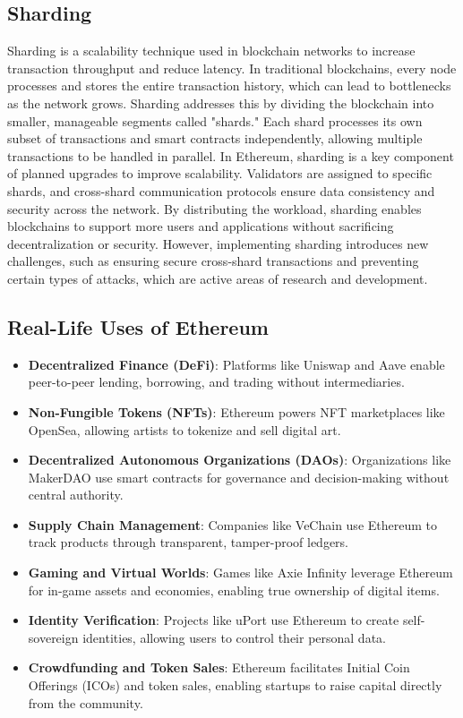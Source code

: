 \documentclass[12pt, a4paper]{article}
\begin{document}
\subsection{Sharding}
Sharding is a scalability technique used in blockchain networks to increase transaction throughput and reduce latency. In traditional blockchains, every node processes and stores the entire transaction history, which can lead to bottlenecks as the network grows. Sharding addresses this by dividing the blockchain into smaller, manageable segments called "shards." Each shard processes its own subset of transactions and smart contracts independently, allowing multiple transactions to be handled in parallel. In Ethereum, sharding is a key component of planned upgrades to improve scalability. Validators are assigned to specific shards, and cross-shard communication protocols ensure data consistency and security across the network. By distributing the workload, sharding enables blockchains to support more users and applications without sacrificing decentralization or security. However, implementing sharding introduces new challenges, such as ensuring secure cross-shard transactions and preventing certain types of attacks, which are active areas of research and development.
\subsection{Real-Life Uses of Ethereum}
\begin{itemize}
    \item \textbf{Decentralized Finance (DeFi)}: Platforms like Uniswap and Aave enable peer-to-peer lending, borrowing, and trading without intermediaries.
    \item \textbf{Non-Fungible Tokens (NFTs)}: Ethereum powers NFT marketplaces like OpenSea, allowing artists to tokenize and sell digital art.
    \item \textbf{Decentralized Autonomous Organizations (DAOs)}: Organizations like MakerDAO use smart contracts for governance and decision-making without central authority.
    \item \textbf{Supply Chain Management}: Companies like VeChain use Ethereum to track products through transparent, tamper-proof ledgers.
    \item \textbf{Gaming and Virtual Worlds}: Games like Axie Infinity leverage Ethereum for in-game assets and economies, enabling true ownership of digital items.
    \item \textbf{Identity Verification}: Projects like uPort use Ethereum to create self-sovereign identities, allowing users to control their personal data.
    \item \textbf{Crowdfunding and Token Sales}: Ethereum facilitates Initial Coin Offerings (ICOs) and token sales, enabling startups to raise capital directly from the community.    
\end{itemize}
\end{document}

